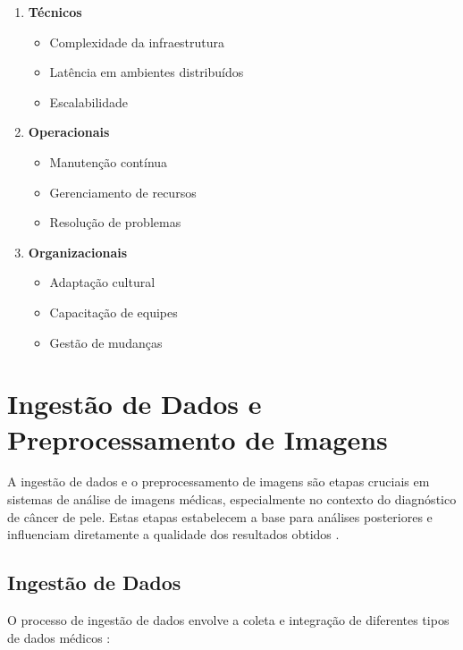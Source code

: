 \begin{enumerate}
\item \textbf{Técnicos}
\begin{itemize}
\item Complexidade da infraestrutura
\item Latência em ambientes distribuídos
\item Escalabilidade
\end{itemize}
\item \textbf{Operacionais}
\begin{itemize}
    \item Manutenção contínua
    \item Gerenciamento de recursos
    \item Resolução de problemas
\end{itemize}

\item \textbf{Organizacionais}
\begin{itemize}
    \item Adaptação cultural
    \item Capacitação de equipes
    \item Gestão de mudanças
\end{itemize}
\end{enumerate}


\section{Ingestão de Dados e Preprocessamento de Imagens}

A ingestão de dados e o preprocessamento de imagens são etapas cruciais em sistemas de análise de imagens médicas, especialmente no contexto do diagnóstico de câncer de pele. Estas etapas estabelecem a base para análises posteriores e influenciam diretamente a qualidade dos resultados obtidos \cite{garcia2023medical}.

\subsection{Ingestão de Dados}

O processo de ingestão de dados envolve a coleta e integração de diferentes tipos de dados médicos \cite{kumar2023data}:

